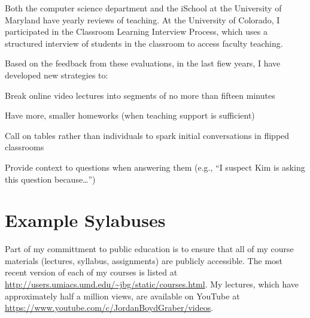 \documentclass[11pt]{amsart}
\newcommand{\student}[1]{\vspace{.5cm}\fbox{\parbox{0.95\linewidth}{{\small #1}}}\vspace{.5cm}}
\begin{document}
Both the computer science department and the iSchool at the University of Maryland have yearly reviews of teaching.
At the University of Colorado, I participated in the Classroom Learning Interview Process, which uses a structured interview of students in the classroom to access faculty teaching.

Based on the feedback from these evaluations, in the last fiew years, I have developed new strategies to:
\begin{itemize*}
  \item Break online video lectures into segments of no more than fifteen minutes
  \item Have more, smaller homeworks (when teaching support is sufficient)
  \item Call on tables rather than individuals to spark initial conversations in flipped classrooms
  \item Provide context to questions when answering them (e.g., ``I suspect Kim is asking this question because\dots'')
\end{itemize*}

\section{Example Sylabuses}

Part of my committment to public education is to ensure that all of my course
materials (lectures, syllabus, assignments) are publicly accessible. The most
recent version of each of my courses is listed at
\url{http://users.umiacs.umd.edu/~jbg/static/courses.html}.  My lectures, which have approximately half a million views, are available on YouTube at \url{https://www.youtube.com/c/JordanBoydGraber/videos}.



\end{document}
